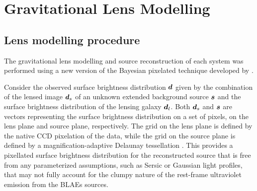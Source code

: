 \documentclass[a4paper,fleqn,usenatbib]{mnras}
\begin{document}

\section{Gravitational Lens Modelling}
\label{sec:models}

\subsection{Lens modelling procedure}


The gravitational lens modelling and source reconstruction of each system was performed using a new version of the Bayesian pixelated technique developed by \citet{V09}. 

Consider the observed surface brightness distribution $\bmath d$ given by the combination of the lensed image $\bmath d_s$ of an unknown extended background source $\bmath s$ and the surface brightness distribution of the lensing galaxy $\bmath d_l$.  Both $\bmath d_s$ and  $\bmath s$ are vectors representing the surface brightness distribution on a set of pixels, on the lens plane and source plane, respectively. The grid on the lens plane is defined by the native CCD pixelation of the data, while the grid on the source plane is defined by a magnification-adaptive Delaunay tessellation \citep[see][for more details]{V09}. This provides a pixellated surface brightness distribution for the reconstructed source that is free from any parameterized assumptions, such as Sersic or Gaussian light profiles, that may not fully account for the clumpy nature of the rest-frame ultraviolet emission from the BLAEs sources.
\end{document}
